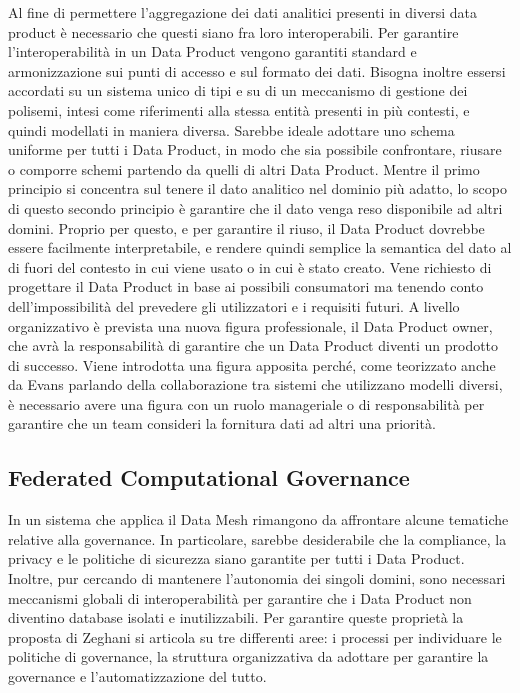 \documentclass[a4paper,12pt]{report}
\begin{document}
Al fine di permettere l'aggregazione dei dati analitici presenti in diversi data product è necessario che questi siano fra loro interoperabili.
Per garantire l'interoperabilità in un Data Product vengono garantiti standard e armonizzazione sui punti di accesso e sul formato dei dati.
Bisogna inoltre essersi accordati su un sistema unico di tipi e su di un meccanismo di gestione dei polisemi, intesi come riferimenti alla stessa entità presenti in più contesti, e quindi modellati in maniera diversa.
Sarebbe ideale adottare uno schema uniforme per tutti i Data Product, in modo che sia possibile confrontare, riusare o comporre schemi partendo da quelli di altri Data Product.
Mentre il primo principio si concentra sul tenere il dato analitico nel dominio più adatto, lo scopo di questo secondo principio è garantire che il dato venga reso disponibile ad altri domini.
Proprio per questo, e per garantire il riuso, il Data Product dovrebbe essere facilmente interpretabile, e rendere quindi semplice la semantica del dato al di fuori del contesto in cui viene usato o in cui è stato creato.
Vene richiesto di progettare il Data Product in base ai possibili consumatori ma tenendo conto dell'impossibilità del prevedere gli utilizzatori e i requisiti futuri.
A livello organizzativo è prevista una nuova figura professionale, il Data Product owner, che avrà la responsabilità di garantire che un Data Product diventi un prodotto di successo.
Viene introdotta una figura apposita perché, come teorizzato anche da Evans parlando della collaborazione tra sistemi che utilizzano modelli diversi, è necessario avere una figura con un ruolo manageriale o di responsabilità per garantire che un team consideri la fornitura dati ad altri una priorità.



\subsection{Federated Computational Governance }\label{federated governance}
In un sistema che applica il Data Mesh rimangono da affrontare alcune tematiche relative alla governance.
In particolare, sarebbe desiderabile che la compliance, la privacy e le politiche di sicurezza siano garantite per tutti i Data Product. 
Inoltre, pur cercando di mantenere l'autonomia dei singoli domini, sono necessari meccanismi globali di interoperabilità per garantire che i Data Product non diventino database isolati e inutilizzabili.
Per garantire queste proprietà la proposta di Zeghani si articola su tre differenti aree: i processi per individuare le politiche di governance, la struttura organizzativa da adottare per garantire la governance e l'automatizzazione del tutto.
\end{document}
